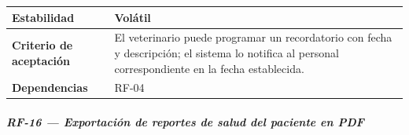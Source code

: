 {\def\LTcaptype{none} %
\begin{longtable}[]{@{}
  >{\raggedright\arraybackslash}p{}
  >{\raggedright\arraybackslash}p{}@{}}
\toprule\noalign{}
\begin{minipage}[b]{\linewidth}\raggedright
\textbf{Estabilidad}
\end{minipage} & \begin{minipage}[b]{\linewidth}\raggedright
Volátil
\end{minipage} \\
\midrule\noalign{}
\endhead
\bottomrule\noalign{}
\endlastfoot
\textbf{Criterio de aceptación} &
\begin{minipage}[t]{\linewidth}\raggedright
El veterinario puede programar un recordatorio con fecha y descripción;
el sistema lo notifica al personal correspondiente en la fecha
establecida.
\end{minipage} \\
\textbf{Dependencias} & \begin{minipage}[t]{\linewidth}\raggedright
RF-04
\end{minipage} \\
\end{longtable}
}

\subparagraph{RF-16 --- Exportación de reportes de salud del paciente en
PDF}\label{rf-16-exportaciuxf3n-de-reportes-de-salud-del-paciente-en-pdf}

